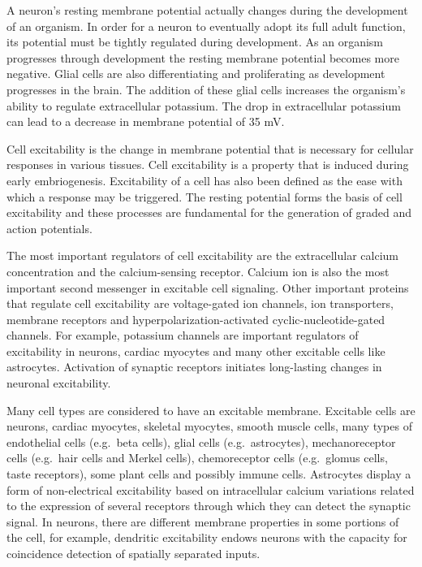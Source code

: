 A neuron's resting membrane potential actually changes during the development of an organism. In order for a neuron to eventually adopt its full adult function, its potential must be tightly regulated during development. As an organism progresses through development the resting membrane potential becomes more negative. Glial cells are also differentiating and proliferating as development progresses in the brain. The addition of these glial cells increases the organism's ability to regulate extracellular potassium. The drop in extracellular potassium can lead to a decrease in membrane potential of 35 mV.

Cell excitability is the change in membrane potential that is necessary for cellular responses in various tissues. Cell excitability is a property that is induced during early embriogenesis. Excitability of a cell has also been defined as the ease with which a response may be triggered. The resting potential forms the basis of cell excitability and these processes are fundamental for the generation of graded and action potentials.

The most important regulators of cell excitability are the extracellular calcium concentration and the calcium-sensing receptor. Calcium ion is also the most important second messenger in excitable cell signaling. Other important proteins that regulate cell excitability are voltage-gated ion channels, ion transporters, membrane receptors and hyperpolarization-activated cyclic-nucleotide-gated channels. For example, potassium channels are important regulators of excitability in neurons, cardiac myocytes and many other excitable cells like astrocytes. Activation of synaptic receptors initiates long-lasting changes in neuronal excitability.

Many cell types are considered to have an excitable membrane. Excitable cells are neurons, cardiac myocytes, skeletal myocytes, smooth muscle cells, many types of endothelial cells (e.g.~beta cells), glial cells (e.g.~astrocytes), mechanoreceptor cells (e.g.~hair cells and Merkel cells), chemoreceptor cells (e.g.~glomus cells, taste receptors), some plant cells and possibly immune cells. Astrocytes display a form of non-electrical excitability based on intracellular calcium variations related to the expression of several receptors through which they can detect the synaptic signal. In neurons, there are different membrane properties in some portions of the cell, for example, dendritic excitability endows neurons with the capacity for coincidence detection of spatially separated inputs.

